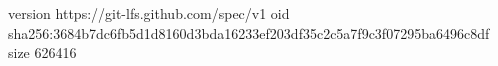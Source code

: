 version https://git-lfs.github.com/spec/v1
oid sha256:3684b7dc6fb5d1d8160d3bda16233ef203df35c2c5a7f9c3f07295ba6496c8df
size 626416
